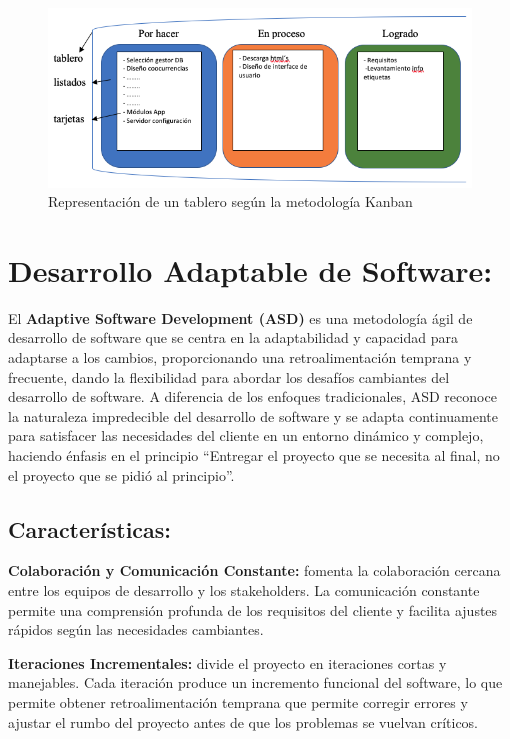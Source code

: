 \documentclass[
  10,
  openany]{book}
\begin{document}
\begin{figure}

{\centering \includegraphics[width=0.7\linewidth]{images/04-metodologia/01_kanban} 

}

\caption{Representación de un tablero según la metodología Kanban}\label{fig:metkanban}
\end{figure}

\hypertarget{mmasd}{%
\section{Desarrollo Adaptable de Software:}\label{mmasd}}

El \textbf{Adaptive Software Development (ASD)} \citep{highsmith2000} es una metodología ágil de desarrollo de software que se centra en la adaptabilidad y capacidad para adaptarse a los cambios, proporcionando una retroalimentación temprana y frecuente, dando la flexibilidad para abordar los desafíos cambiantes del desarrollo de software. A diferencia de los enfoques tradicionales, ASD reconoce la naturaleza impredecible del desarrollo de software y se adapta continuamente para satisfacer las necesidades del cliente en un entorno dinámico y complejo, haciendo énfasis en el principio ``Entregar el proyecto que se necesita al final, no el proyecto que se pidió al principio''.

\hypertarget{caracteruxedsticas}{%
\subsection{Características:}\label{caracteruxedsticas}}

\textbf{Colaboración y Comunicación Constante:} fomenta la colaboración cercana entre los equipos de desarrollo y los stakeholders. La comunicación constante permite una comprensión profunda de los requisitos del cliente y facilita ajustes rápidos según las necesidades cambiantes.

\textbf{Iteraciones Incrementales:} divide el proyecto en iteraciones cortas y manejables. Cada iteración produce un incremento funcional del software, lo que permite obtener retroalimentación temprana que permite corregir errores y ajustar el rumbo del proyecto antes de que los problemas se vuelvan críticos.
\end{document}
